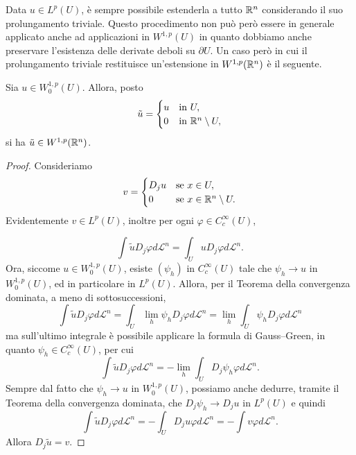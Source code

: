 Data $u \in L^p(U)$, è sempre possibile estenderla a tutto $\mathbb{R}^n$ considerando il suo prolungamento triviale. Questo procedimento non può però essere in generale applicato anche ad applicazioni in $W^{1,p}(U)$ in quanto dobbiamo anche preservare l'esistenza delle derivate deboli su $\partial U$. Un caso però in cui il prolungamento triviale restituisce un'estensione in $W^{1,p}(\mathbb{R}^n)$ è il seguente.
\begin{proposizione}
	Sia $u \in W^{1,p}_0(U)$. Allora, posto
	\[ \tilde{u} = \begin{cases}
		u & \textup{in } U, \\
		0 & \textup{in } \mathbb{R}^n\setminus U,
	\end{cases} \]
	si ha $\tilde{u} \in W^{1,p}(\mathbb{R}^n)$.
\end{proposizione}
\begin{proof}
	Consideriamo 
	\[ v = \begin{cases}
		D_j u & \textup{se } x \in U,\\
		0 & \textup{se } x \in \mathbb{R}^n\setminus U.
	\end{cases} \]
	Evidentemente $v \in L^p(U)$, inoltre per ogni $\varphi \in C^\infty_c(U)$,
	
	\[ \int \tilde{u} D_j \varphi d\mathcal{L}^n = \int_{U} u D_j \varphi d\mathcal{L}^n. \]
	Ora, siccome $u \in W^{1,p}_0(U)$, esiste $(\psi_h) $ in $C^\infty_c(U)$ tale che $\psi_h \to u$ in $W^{1,p}_0(U)$, ed in particolare in $L^p(U)$. Allora, per il Teorema della convergenza dominata, a meno di sottosuccessioni,
	\[ \int \tilde{u} D_j \varphi d\mathcal{L}^n = \int_{U} \lim_h \psi_h D_j \varphi d\mathcal{L}^n = \lim_h  \int_{U} \psi_h D_j \varphi d\mathcal{L}^n\]
	ma sull'ultimo integrale è possibile applicare la formula di Gauss--Green, in quanto $\psi_h \in C^\infty_c(U)$, per cui
	\[ \int \tilde{u} D_j \varphi d\mathcal{L}^n = - \lim_h \int_U D_j \psi_h \varphi d\mathcal{L}^n.\]
	Sempre dal fatto che $\psi_h \to u$ in $W^{1,p}_0(U)$, possiamo anche dedurre, tramite il Teorema della convergenza dominata, che $D_j \psi_h \to D_j u$ in $L^p(U)$ e quindi
	\[  \int \tilde{u} D_j \varphi d\mathcal{L}^n = - \int_U D_j u \varphi d\mathcal{L}^n = - \int v \varphi d\mathcal{L}^n. \]
	Allora $D_j \tilde{u} = v$.
\end{proof}


